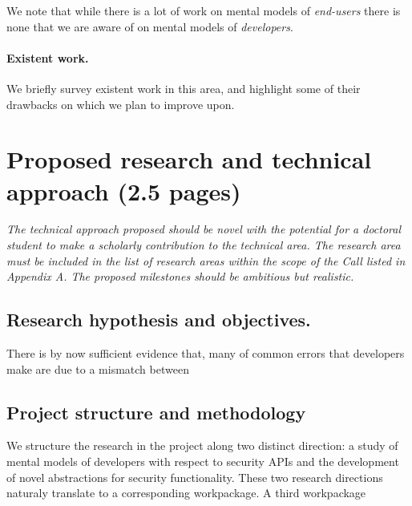 \documentclass[10pt]{article}
\begin{document}
We note that while there is a lot of work on mental models of \emph{end-users} there is  none that we are aware of on mental models of \emph{developers}. 





\paragraph{Existent work.} We briefly survey existent work in this area, and highlight some of their drawbacks on which we plan to improve upon.


\section{Proposed research and technical approach (2.5 pages)}

\emph{The technical approach proposed should be novel with the potential for a doctoral student to make a scholarly contribution to the technical area. The research area must be included in the list of research areas within the scope of the Call listed in Appendix A. The proposed milestones should be ambitious but realistic.}




%

\subsection{Research hypothesis and objectives.}


There is by now sufficient evidence that, many of common errors that developers make are due to a mismatch between 






\subsection{Project structure and methodology}


We structure the research in the project along two distinct direction: a study of mental models of developers with respect to security APIs and the development of novel abstractions for security functionality.  These two research directions naturaly translate to a corresponding workpackage. 
A third workpackage 
\end{document}
